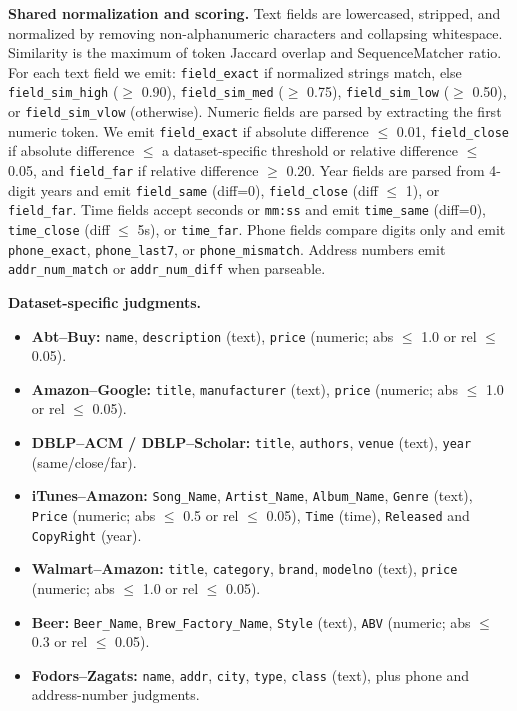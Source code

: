 \documentclass{article}
\begin{document}
\textbf{Shared normalization and scoring.} Text fields are lowercased, stripped, and normalized by removing non-alphanumeric characters and collapsing whitespace. Similarity is the maximum of token Jaccard overlap and SequenceMatcher ratio. For each text field we emit:
\texttt{field\_exact} if normalized strings match, else
\texttt{field\_sim\_high} ($\ge$ 0.90),
\texttt{field\_sim\_med} ($\ge$ 0.75),
\texttt{field\_sim\_low} ($\ge$ 0.50), or
\texttt{field\_sim\_vlow} (otherwise).
Numeric fields are parsed by extracting the first numeric token. We emit \texttt{field\_exact} if absolute difference $\le$ 0.01, \texttt{field\_close} if absolute difference $\le$ a dataset-specific threshold or relative difference $\le$ 0.05, and \texttt{field\_far} if relative difference $\ge$ 0.20. Year fields are parsed from 4-digit years and emit \texttt{field\_same} (diff=0), \texttt{field\_close} (diff $\le$ 1), or \texttt{field\_far}. Time fields accept seconds or \texttt{mm:ss} and emit \texttt{time\_same} (diff=0), \texttt{time\_close} (diff $\le$ 5s), or \texttt{time\_far}. Phone fields compare digits only and emit \texttt{phone\_exact}, \texttt{phone\_last7}, or \texttt{phone\_mismatch}. Address numbers emit \texttt{addr\_num\_match} or \texttt{addr\_num\_diff} when parseable.

\textbf{Dataset-specific judgments.}
\begin{itemize}
  \item \textbf{Abt--Buy:} \texttt{name}, \texttt{description} (text), \texttt{price} (numeric; abs $\le$ 1.0 or rel $\le$ 0.05).
  \item \textbf{Amazon--Google:} \texttt{title}, \texttt{manufacturer} (text), \texttt{price} (numeric; abs $\le$ 1.0 or rel $\le$ 0.05).
  \item \textbf{DBLP--ACM / DBLP--Scholar:} \texttt{title}, \texttt{authors}, \texttt{venue} (text), \texttt{year} (same/close/far).
  \item \textbf{iTunes--Amazon:} \texttt{Song\_Name}, \texttt{Artist\_Name}, \texttt{Album\_Name}, \texttt{Genre} (text), \texttt{Price} (numeric; abs $\le$ 0.5 or rel $\le$ 0.05), \texttt{Time} (time), \texttt{Released} and \texttt{CopyRight} (year).
  \item \textbf{Walmart--Amazon:} \texttt{title}, \texttt{category}, \texttt{brand}, \texttt{modelno} (text), \texttt{price} (numeric; abs $\le$ 1.0 or rel $\le$ 0.05).
  \item \textbf{Beer:} \texttt{Beer\_Name}, \texttt{Brew\_Factory\_Name}, \texttt{Style} (text), \texttt{ABV} (numeric; abs $\le$ 0.3 or rel $\le$ 0.05).
  \item \textbf{Fodors--Zagats:} \texttt{name}, \texttt{addr}, \texttt{city}, \texttt{type}, \texttt{class} (text), plus phone and address-number judgments.
\end{itemize}
\end{document}
